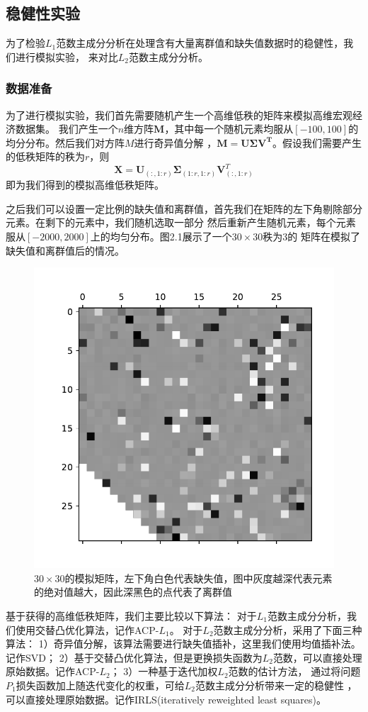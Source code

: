 \subsection{稳健性实验}\label{lab-1}
为了检验$L_1$范数主成分分析在处理含有大量离群值和缺失值数据时的稳健性，我们进行模拟实验，
来对比$L_2$范数主成分分析。

\subsubsection{数据准备}
为了进行模拟实验，我们首先需要随机产生一个高维低秩的矩阵来模拟高维宏观经济数据集。
我们产生一个$n$维方阵$\bm M$，其中每一个随机元素均服从$[-100, 100]$的均分分布。然后我们对方阵$M$进行奇异值分解
，$\bm M = \bm U\bm\Sigma \bm V^{\bm T}$。假设我们需要产生的低秩矩阵的秩为$r$，则$$\bm X = \bm 
U_{(:,1:r)}\bm \Sigma_{(1:r,1:r)}\bm V^T_{(:,1:r)}$$
即为我们得到的模拟高维低秩矩阵。

之后我们可以设置一定比例的缺失值和离群值，首先我们在矩阵的左下角剔除部分元素。在剩下的元素中，我们随机选取一部分
然后重新产生随机元素，每个元素服从$[-2000,2000]$上的均匀分布。图2.1展示了一个$30\times30$秩为3的
矩阵在模拟了缺失值和离群值后的情况。

\begin{figure}[H]
    \centering
    \includegraphics[width=.5\textwidth]{pics/chapter2/matrix.pdf}
    \caption{\small $30\times30$的模拟矩阵，左下角白色代表缺失值，图中灰度越深代表元素的绝对值越大，因此深黑色的点代表了离群值}
    \label{fig2.1}
\end{figure}

基于获得的高维低秩矩阵，我们主要比较以下算法：
对于$L_1$范数主成分分析，我们使用交替凸优化算法，记作ACP-$L_1$。
对于$L_2$范数主成分分析，采用了下面三种算法：
1）奇异值分解，该算法需要进行缺失值插补，这里我们使用均值插补法。记作SVD；
2）基于交替凸优化算法，但是更换损失函数为$L_2$范数，可以直接处理原始数据。记作ACP-$L_2$；
3）一种基于迭代加权$L_2$范数的估计方法\cite{srebro2003weighted}，
通过将问题$P_1$损失函数加上随迭代变化的权重，可给$L_2$范数主成分分析带来一定的稳健性
，可以直接处理原始数据。记作IRLS(iteratively reweighted least squares)。

